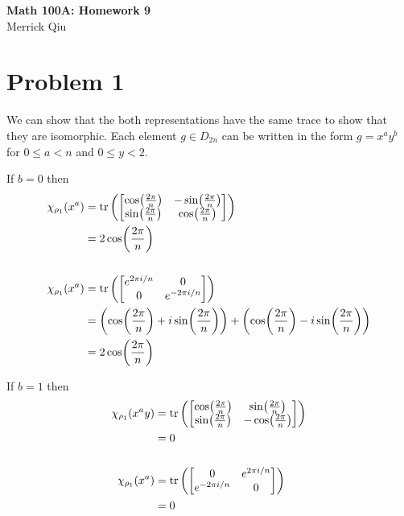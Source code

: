 \documentclass{article}
\begin{document}
\begin{center}
	\huge{\bf Math 100A: Homework 9} \\
	Merrick Qiu
\end{center}

\section*{Problem 1}
We can show that the both representations have the same trace
to show that they are isomorphic.
Each element $g \in D_{2n}$ can be written in the form
$g = x^ay^b$ for $0 \leq a < n$ and $0 \leq y < 2$.

If $b = 0$ then 
\begin{align*}
	\chi_{\rho_1}(x^a) &= 
	\tr
	\left(\begin{bmatrix}
		\cos(\frac{2\pi}{n}) & -\sin(\frac{2\pi}{n})\\
		\sin(\frac{2\pi}{n}) & \cos(\frac{2\pi}{n})
	\end{bmatrix} \right) \\ &= 2\cos(\frac{2\pi}{n}) \\ \\
	\chi_{\rho_1}(x^a) &= 
	\tr
	\left(\begin{bmatrix}
		e^{2\pi i/n} & 0\\
		0 & e^{-2\pi i/n}
	\end{bmatrix} \right) \\ &= 
	\left(\cos(\frac{2\pi}{n}) + i\sin(\frac{2\pi}{n})\right) +
	\left(\cos(\frac{2\pi}{n}) - i\sin(\frac{2\pi}{n})\right) \\ &=
	2\cos(\frac{2\pi}{n})
\end{align*}

If $b=1$ then 
\begin{align*}
	\chi_{\rho_1}(x^ay) &= 
	\tr
	\left(\begin{bmatrix}
		\cos(\frac{2\pi}{n}) & \sin(\frac{2\pi}{n})\\
		\sin(\frac{2\pi}{n}) & -\cos(\frac{2\pi}{n})
	\end{bmatrix} \right) \\ &= 0 \\ \\
	\chi_{\rho_1}(x^a) &= 
	\tr
	\left(\begin{bmatrix}
		0 & e^{2\pi i/n} \\
		e^{-2\pi i/n} & 0
	\end{bmatrix} \right) \\ &= 
	0
\end{align*}
\end{document}
